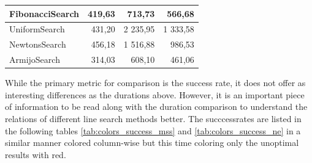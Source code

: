 \documentclass[a4paper,english,titlepage,12pt]{article}
\begin{document}
\begin{table}[H]
\begin{tabular}{|l|r|r|r|}
    FibonacciSearch                                                           & 419,63                                                    & \cellcolor[HTML]{C9E9D9}713,73                           & \cellcolor[HTML]{A5DABF}566,68                                \\ \hline
    UniformSearch                                                             & 431,20                                                    & \cellcolor[HTML]{E67B73}2 235,95                         & \cellcolor[HTML]{EDA19C}1 333,58                              \\ \hline
    NewtonsSearch                                                             & 456,18                                                    & \cellcolor[HTML]{EDA19C}1 516,88                         & \cellcolor[HTML]{F7D3D0}986,53                                \\ \hline
    ArmijoSearch                                                              & \cellcolor[HTML]{57BB89}314,03                            & \cellcolor[HTML]{57BB89}608,10                           & \cellcolor[HTML]{57BB89}461,06                                \\ \hline
    \end{tabular}
\end{table}


While the primary metric for comparison is the success rate, it does not offer as interesting differences as the durations above. However, it is an important piece of information to be read along with the duration comparison to understand the relations of different line search methods better. The succcessrates are listed in the following tables \ref{tab:colors_success_mss} and \ref{tab:colors_success_ne} in a similar manner colored column-wise but this time coloring only the unoptimal results with red.
\end{document}

